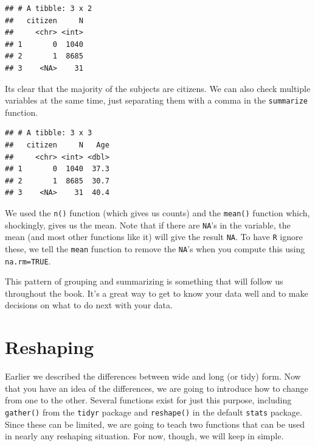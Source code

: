\documentclass[]{tufte-book}
\newenvironment{Shaded}{}{}
\newcommand{\KeywordTok}[1]{\textcolor[rgb]{0.00,0.44,0.13}{\textbf{#1}}}
\newcommand{\DataTypeTok}[1]{\textcolor[rgb]{0.56,0.13,0.00}{#1}}
\newcommand{\StringTok}[1]{\textcolor[rgb]{0.25,0.44,0.63}{#1}}
\newcommand{\OtherTok}[1]{\textcolor[rgb]{0.00,0.44,0.13}{#1}}
\newcommand{\OperatorTok}[1]{\textcolor[rgb]{0.40,0.40,0.40}{#1}}
\newcommand{\NormalTok}[1]{#1}
\theoremstyle{definition}
\theoremstyle{definition}
\theoremstyle{remark}
\begin{document}
\begin{verbatim}
## # A tibble: 3 x 2
##   citizen     N
##     <chr> <int>
## 1       0  1040
## 2       1  8685
## 3    <NA>    31
\end{verbatim}

Its clear that the majority of the subjects are citizens. We can also
check multiple variables at the same time, just separating them with a
comma in the \texttt{summarize} function.

\begin{Shaded}
\end{Shaded}

\begin{verbatim}
## # A tibble: 3 x 3
##   citizen     N   Age
##     <chr> <int> <dbl>
## 1       0  1040  37.3
## 2       1  8685  30.7
## 3    <NA>    31  40.4
\end{verbatim}

We used the \texttt{n()} function (which gives us counts) and the
\texttt{mean()} function which, shockingly, gives us the mean. Note that
if there are \texttt{NA}'s in the variable, the mean (and most other
functions like it) will give the result \texttt{NA}. To have \texttt{R}
ignore these, we tell the \texttt{mean} function to remove the
\texttt{NA}'s when you compute this using \texttt{na.rm=TRUE}.

This pattern of grouping and summarizing is something that will follow
us throughout the book. It's a great way to get to know your data well
and to make decisions on what to do next with your data.

\section*{Reshaping}\label{reshaping}

Earlier we described the differences between wide and long (or tidy)
form. Now that you have an idea of the differences, we are going to
introduce how to change from one to the other. Several functions exist
for just this purpose, including \texttt{gather()} from the
\texttt{tidyr} package and \texttt{reshape()} in the default
\texttt{stats} package. Since these can be limited, we are going to
teach two functions that can be used in nearly any reshaping situation.
For now, though, we will keep in simple.
\end{document}
